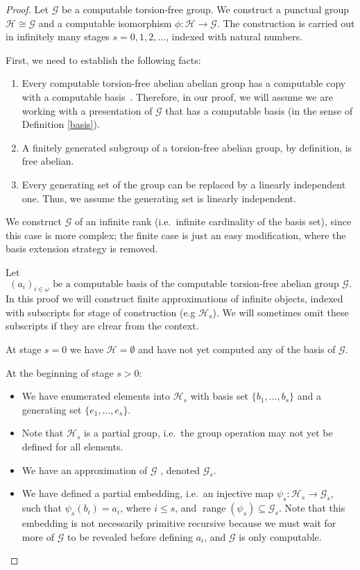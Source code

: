 \documentclass{pracalicmgr2025}
\theoremstyle{plain}            %
\theoremstyle{remark}           %
\theoremstyle{definition}       %
\begin{document}
\begin{proof}
Let $\mathcal{G}$ be a computable torsion-free group. We construct a punctual group $\mathcal{H} \cong \mathcal{G}$ and a computable isomorphism $\phi:\mathcal{H}\to\mathcal{G}$. The construction is carried out in infinitely many stages $s = 0,1,2,\dots$, indexed with natural numbers.

First, we need to establish the following facts:
\begin{enumerate}
    \item Every computable torsion-free abelian abelian group has a computable copy with a computable basis~\cite{HARRISONTRAINOR2015441}. Therefore, in our proof, we will assume we are working with a presentation of $\mathcal{G}$ that has a computable basis (in the sense of Definition \ref{basis}).
    \item A finitely generated subgroup of a torsion-free abelian group, by definition, is free abelian.
    \item Every generating set of the group can be replaced by a linearly independent one. Thus, we assume the generating set is linearly independent.
\end{enumerate}

We construct $\mathcal{G}$ of an infinite rank (i.e.\ infinite cardinality of the basis set), since this case is more complex; the finite case is just an easy modification, where the basis extension strategy is removed. 

Let
$$
(a_i)_{i \in \omega} \text{ be a computable basis of the computable torsion-free abelian group } \mathcal{G}.
$$
In this proof we will construct finite approximations of infinite objects, indexed with subscripts for stage of construction (e.g $\mathcal{H}_s$). We will sometimes omit these subscripts if they are clrear from the context.


At stage $s = 0$ we have $\mathcal{H} = \emptyset$ and have not yet computed any of the basis of $\mathcal{G}$.

At the beginning of stage $s>0$:
\begin{itemize}
    \item We have enumerated elements into $\mathcal{H}_s$ with basis set $\{b_1,\dots,b_s\}$ and a generating set $\{e_1,\dots,e_s\}$.
    \item Note that $\mathcal{H}_s$ is a partial group, i.e.\ the group operation may not yet be defined for all elements.
    \item We have an approximation of $\mathcal{G}$ , denoted $\mathcal{G}_s$.
    \item We have defined a partial embedding, i.e.\ an injective map $\psi_s:  \mathcal{H}_s \to \mathcal{G}_s$, such that $\psi_s(b_i)=a_i$, where $i\leq s$, and $\operatorname{range}(\psi_s) \subseteq \mathcal{G}_s$. Note that this embedding is not necessarily primitive recursive because we must wait for more of $\mathcal{G}$ to be revealed before defining $a_i$, and $\mathcal{G}$ is only computable.
\end{itemize}


\end{proof}
\end{document}
